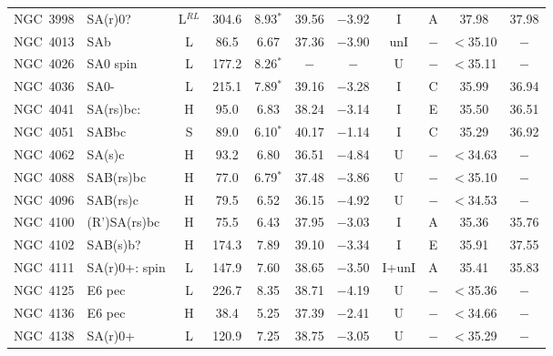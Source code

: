 \begin{center}
\begin{longtable}{lC{2.5cm}ccccccccc}
NGC~3998    & SA(r)0?         & L$^{RL}$                 & 304.6 & 8.93$^{*}$       & 39.56 & $-$3.92        & I   & A        & 37.98     &  37.98     \\
NGC~4013  &  SAb            &   L            &   86.5   &  6.67  &    37.36   &  $-$3.90   & unI &  $-$      & $<$35.10 & $-$  \\
NGC~4026    & SA0 spin        &   L     & 177.2 & 8.26$^{*}$      & $-$      & $-$        & U   &$-$        & $<$35.11 & $-$     \\
NGC~4036   & SA0-            & L                & 215.1 & 7.89$^{*}$       & 39.16    & $-$3.28      & I   & C        & 35.99    & 36.94   \\
NGC~4041   & SA(rs)bc:    & H                & 95.0    & 6.83            & 38.24    & $-$3.14     & I   & E         & 35.50   & 36.51   \\
NGC~4051  &  SABbc       &   S              &     89.0     &  6.10$^{*}$  &  40.17  & $-$1.14    &     I & C    &   35.29   &   36.92   \\
NGC~4062   & SA(s)c     & H                & 93.2  & 6.80             & 36.51    & $-$4.84      & U   &$-$        & $<$34.63 & $-$      \\
NGC~4088   & SAB(rs)bc & H                & 77.0    & 6.79$^{*}$       & 37.48    & $-$3.86       & U   &$-$        & $<$35.10   &  $-$  \\
NGC~4096   & SAB(rs)c & H                & 79.5  & 6.52             & 36.15    & $-$4.92     & U   &$-$        & $<$34.53 & $-$      \\
NGC~4100   & (R')SA(rs)bc & H                & 75.5  & 6.43             &  37.95    & $-$3.03     & I   & A         & 35.36    & 35.76  \\
NGC~4102   & SAB(s)b?   & H                & 174.3 & 7.89             & 39.10    & $-$3.34      & I   & E         & 35.91    & 37.55   \\
NGC~4111   & SA(r)0+: spin & L                & 147.9 & 7.60             & 38.65    & $-$3.50       & I+unI   & A     & 35.41    & 35.83   \\
NGC~4125   & E6 pec & L           & 226.7 & 8.35            & 38.71    & $-$4.19      & U   &$-$        & $<$35.36 & $-$      \\
NGC~4136   & E6 pec & H                & 38.4  & 5.25            & 37.39    & $-$2.41       & U   &$-$       & $<$34.66 & $-$       \\
NGC~4138   & SA(r)0+       & L                & 120.9 & 7.25            & 38.75    & $-$3.05        & U   &$-$       & $<$35.29 & $-$       \\

\end{longtable}
\end{center}
